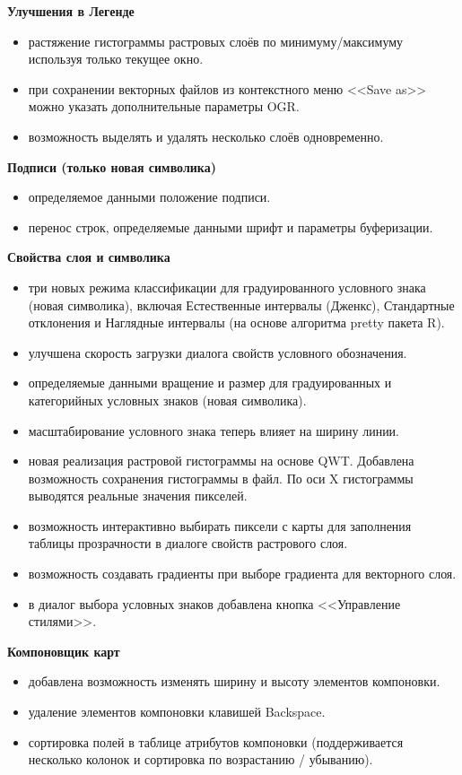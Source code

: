 \textbf{Улучшения в Легенде}

\begin{itemize}[label=--]
\item растяжение гистограммы растровых слоёв по минимуму/максимуму
используя только текущее окно.
\item при сохранении векторных файлов из контекстного меню <<Save as>>
можно указать дополнительные параметры OGR.
\item возможность выделять и удалять несколько слоёв одновременно.
\end{itemize}

\textbf{Подписи (только новая символика)}

\begin{itemize}[label=--]
\item определяемое данными положение подписи.
\item перенос строк, определяемые данными шрифт и параметры буферизации.
\end{itemize}

\textbf{Свойства слоя и символика}

\begin{itemize}[label=--]
\item три новых режима классификации для градуированного условного знака
(новая символика), включая Естественные интервалы (Дженкс), Стандартные
отклонения и Наглядные интервалы (на основе алгоритма pretty пакета R).
\item улучшена скорость загрузки диалога свойств условного обозначения.
\item определяемые данными вращение и размер для градуированных и категорийных
условных знаков (новая символика).
\item масштабирование условного знака теперь влияет на ширину линии.
\item новая реализация растровой гистограммы на основе QWT. Добавлена
возможность сохранения гистограммы в файл. По оси X гистограммы выводятся
реальные значения пикселей.
\item возможность интерактивно выбирать пиксели с карты для заполнения
таблицы прозрачности в диалоге свойств растрового слоя.
\item возможность создавать градиенты при выборе градиента для векторного слоя.
\item в диалог выбора условных знаков добавлена кнопка <<Управление стилями>>.
\end{itemize}

\textbf{Компоновщик карт}

\begin{itemize}[label=--]
\item добавлена возможность изменять ширину и высоту элементов компоновки.
\item удаление элементов компоновки клавишей Backspace.
\item сортировка полей в таблице атрибутов компоновки (поддерживается
несколько колонок и сортировка по возрастанию / убыванию).
\end{itemize}

